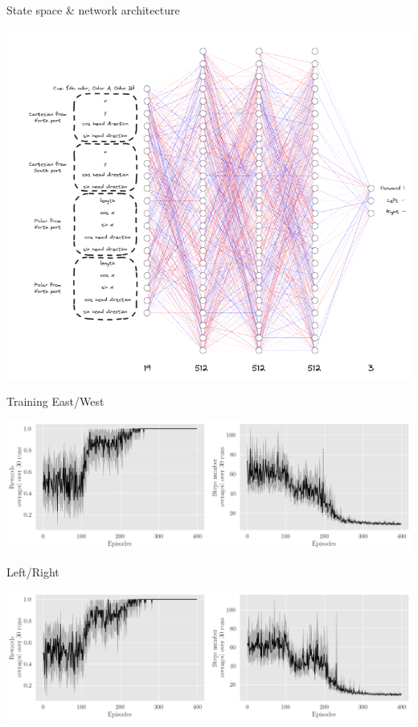 \documentclass[bigger]{beamer}
\begin{document}
\begin{frame}[label={sec:orgbaa7ef4}]{State space \& network architecture}
\begin{center}
\includegraphics[height=0.95\textheight]{img/state-space-nn.png}
\end{center}
\end{frame}
\begin{frame}[label={sec:orgf41095c}]{Training}
East/West
\begin{center}
\includegraphics[height=0.35\textheight]{img/steps-and-rewards-EastWest.png}
\end{center}
Left/Right
\begin{center}
\includegraphics[height=0.35\textheight]{img/steps-and-rewards-LeftRight.png}
\end{center}
\end{frame}
\end{document}
